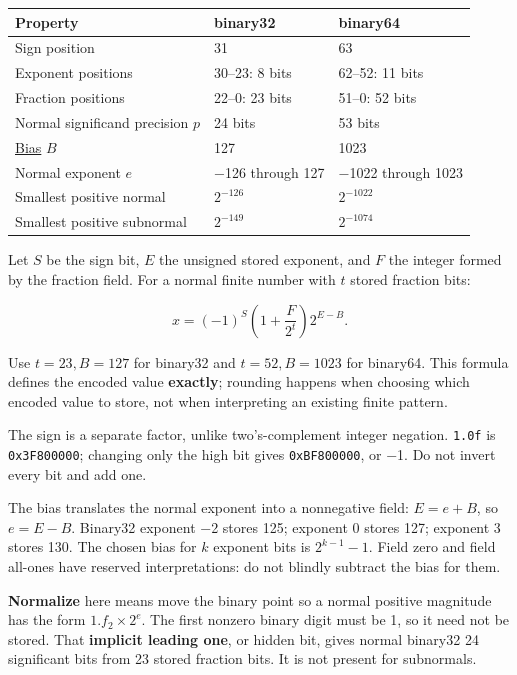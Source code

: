 {\def\LTcaptype{none} %
\begin{longtable}[]{@{}lll@{}}
\toprule\noalign{}
Property & binary32 & binary64 \\
\midrule\noalign{}
\endhead
\bottomrule\noalign{}
\endlastfoot
Sign position & 31 & 63 \\
Exponent positions & 30--23: 8 bits & 62--52: 11 bits \\
Fraction positions & 22--0: 23 bits & 51--0: 52 bits \\
Normal significand precision \(p\) & 24 bits & 53 bits \\
\hyperref[appendix-2fae058c82e1]{Bias} \(B\) & 127 & 1023 \\
Normal exponent \(e\) & −126 through 127 & −1022 through 1023 \\
Smallest positive normal & \(2^{-126}\) & \(2^{-1022}\) \\
Smallest positive subnormal & \(2^{-149}\) & \(2^{-1074}\) \\
\end{longtable}
}

Let \(S\) be the sign bit, \(E\) the unsigned stored exponent, and \(F\) the integer formed by the fraction field. For a normal finite number with \(t\) stored fraction bits:

\[
x=(-1)^S\left(1+\frac{F}{2^t}\right)2^{E-B}.
\]

Use \(t=23,B=127\) for binary32 and \(t=52,B=1023\) for binary64. This formula defines the encoded value \textbf{exactly}; rounding happens when choosing which encoded value to store, not when interpreting an existing finite pattern.

The sign is a separate factor, unlike two's-complement integer negation. \texttt{1.0f} is \texttt{0x3F800000}; changing only the high bit gives \texttt{0xBF800000}, or −1. Do not invert every bit and add one.

The bias translates the normal exponent into a nonnegative field: \(E=e+B\), so \(e=E-B\). Binary32 exponent −2 stores 125; exponent 0 stores 127; exponent 3 stores 130. The chosen bias for \(k\) exponent bits is \(2^{k-1}-1\). Field zero and field all-ones have reserved interpretations: do not blindly subtract the bias for them.

\textbf{Normalize} here means move the binary point so a normal positive magnitude has the form \(1.f_2\times2^e\). The first nonzero binary digit must be 1, so it need not be stored. That \textbf{implicit leading one}, or hidden bit, gives normal binary32 24 significant bits from 23 stored fraction bits. It is not present for subnormals.

